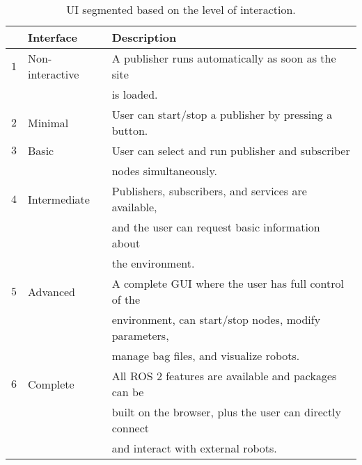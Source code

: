         \begin{table}[htbp]
            \color{textColor}
            \centering	
            \caption{\ac{UI} segmented based on the level of interaction.}
                \begin{tabular}{rll}
                    \toprule
                    & \textbf{Interface} & \textbf{Description} \\
                    \midrule
                    $1$ & Non-interactive & A publisher runs automatically as soon as the site\\
                    & & is loaded. \\ [0.5em]

                    $2$ & Minimal         & User can start/stop a publisher by pressing a button.\\[0.5em]

                    $3$ & Basic           & User can select and run publisher and subscriber \\
                    & & nodes simultaneously.\\[0.5em]

                    $4$ & Intermediate    & Publishers, subscribers, and services are available,\\
                    & & and the user can request basic information about\\
                    & & the environment.\\[0.5em]

                    $5$ & Advanced        & A complete GUI where the user has full control of the \\
                    & & environment, can start/stop nodes, modify parameters, \\
                    & & manage bag files, and visualize robots. \\[0.5em]

                    $6$ & Complete        & All ROS 2 features are available and packages can be \\
                    & & built on the browser, plus the user can directly connect\\
                    & & and interact with external robots.\\

                \bottomrule
            \end{tabular}\label{tab:uilevels}
        \end{table}



